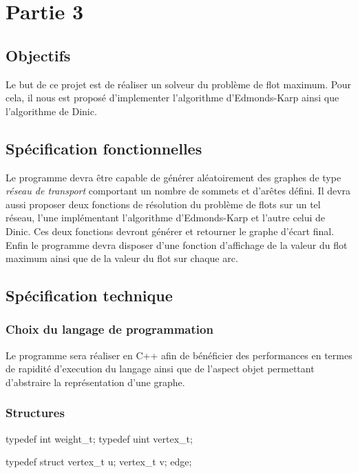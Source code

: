 
\section{Partie 3}

\subsection{Objectifs}

Le but de ce projet est de réaliser un solveur du problème de flot maximum. Pour cela, il 
nous est proposé d'implementer l'algorithme d'Edmonds-Karp ainsi que l'algorithme de Dinic.

\subsection{Spécification fonctionnelles}

Le programme devra être capable de générer aléatoirement des graphes de type \emph{réseau de transport}
comportant un nombre de sommets et d'arêtes défini. Il devra aussi proposer deux fonctions 
de résolution du problème de flots sur un tel réseau, l'une implémentant l'algorithme d'Edmonds-Karp et
l'autre celui de Dinic. Ces deux fonctions devront générer et retourner le graphe d'écart final. Enfin
le programme devra disposer d'une fonction d'affichage de la valeur du flot maximum ainsi que de la 
valeur du flot sur chaque arc.

\subsection{Spécification technique}

\subsubsection{Choix du langage de programmation}

Le programme sera réaliser en C++ afin de bénéficier des performances en termes de rapidité d'execution 
du langage ainsi que de l'aspect objet permettant d'abstraire la représentation d'une graphe.

\subsubsection{Structures}

typedef int weight_t;
typedef uint vertex_t;

typedef struct
{
  vertex_t u;
  vertex_t v;
} edge;

